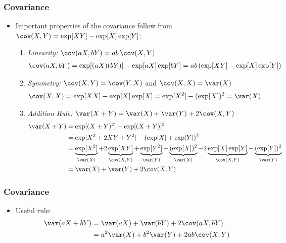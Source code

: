 \begin{frame}
\frametitle{Covariance} 
\begin{itemize}
\item Important properties of the covariance follow from $\cov(X,Y) = \exp[XY]- \exp[X]\exp[Y]$:
\begin{enumerate}
\item \emph{Linearity:} \quad $\cov(aX,bY) = ab\,\cov(X,Y)$
\begin{align*}
\cov(aX, bY) = \exp[(aX)(bY)] - \exp[aX]\exp[bY] = ab\left(\exp[XY] - \exp[X]\exp[Y]\right)
\end{align*} 
\item \emph{Symmetry:} \quad $\cov(X,Y) = \cov(Y,X)$ and $\cov(X,X) = \var(X)$
\begin{align*}
\cov(X,X) = \exp[XX] - \exp[X]\exp[X] = \exp[X^2]-(\exp[X])^2 = \var(X)
\end{align*} 
\item \emph{Addition Rule:} \quad $\var(X+Y) = \var(X) + \var(Y) + 2\cov(X,Y)$
\begin{align*}
\var(X+Y)
    & = \exp[(X+Y)^2] - \exp[(X+Y)]^2	\\
    & = \exp[X^2 + 2XY + Y^2] - \left(\exp[X] + \exp[Y]\right)^2\\
    & = \underbrace{\exp[X^2]}_{\var(X)} + 2\underbrace{\exp[XY]}_{\cov(X,Y)} + \underbrace{\exp[Y^2]}_{\var(Y)} - \underbrace{(\exp[X])^2}_{\var(X)} - 2\underbrace{\exp[X]\exp[Y]}_{\cov(X,Y)} - \underbrace{(\exp[Y])^2}_{\var(Y)}\\
    & = \var(X) + \var(Y) + 2\cov(X,Y)
\end{align*}
\end{enumerate}
\end{itemize}
\end{frame}


\begin{frame}
\frametitle{Covariance} 
\begin{itemize}
\item Useful rule:
\begin{align*}
\var(aX + bY) 
    & = \var(aX) + \var(bY) + 2\cov(aX,bY) \\ 
    & = a^2\var(X) + b^2\var(Y) + 2ab\cov(X,Y)
\end{align*}
\end{itemize}
\end{frame}


